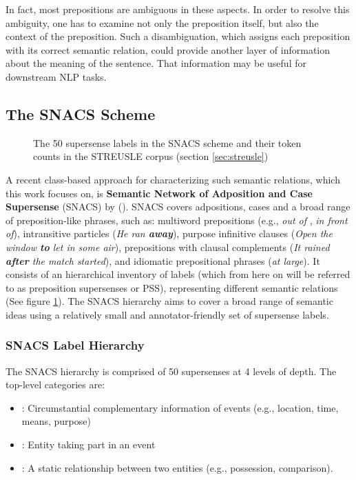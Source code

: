 In fact, most prepositions are ambiguous in these aspects. In order to resolve this ambiguity, one has to examine not only the preposition itself, but also the context of the preposition. Such a disambiguation, which assigns each preposition with its correct semantic relation, could provide another layer of information about the meaning of the sentence. That information may be useful for downstream NLP tasks.

\subsection{The SNACS Scheme} \label{sec:snacsscheme}

\begin{figure}
    \centering\small
    
    \caption{The 50 supersense labels in the SNACS scheme and their token counts in the STREUSLE corpus (section \ref{sec:streusle})}
    \label{fig:snacs}
\end{figure}

A recent class-based approach for characterizing such semantic relations, which this work focuses on, is \textbf{Semantic Network of Adposition and Case Supersense} (SNACS) by (\cite{snacs}). SNACS covers adpositions, cases and a broad range of preposition-like phrases, such as: multiword prepositions (e.g., \emph{out of} , \emph{in front of}), intransitive particles (\emph{He ran \textbf{away}}), purpose infinitive clauses (\emph{Open the window \textbf{to} let in some air}), prepositions with clausal complements (\emph{It rained \textbf{after} the match started}), and idiomatic prepositional phrases (\textit{at large}). It consists of an hierarchical inventory of labels (which from here on will be referred to as preposition supersenses or PSS), representing different semantic relations (See figure \ref{fig:snacs}). The SNACS hierarchy aims to cover a broad range of semantic ideas using a relatively small and annotator-friendly set of supersense labels.

\subsubsection{SNACS Label Hierarchy}

The SNACS hierarchy is comprised of 50 supersenses at 4 levels of depth. The top-level categories are:
\begin{itemize}
    \item {}:  Circumstantial complementary information of events (e.g., location, time, means, purpose)
    \item {}: Entity taking part in an event
    \item {}: A static relationship between two entities (e.g., possession, comparison).
\end{itemize}

